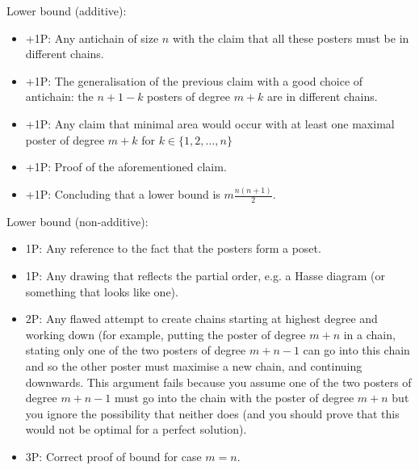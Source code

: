 {Lower bound (additive):
\begin{itemize}
\item +1P: Any antichain of size $n$ with the claim that all these posters must be in different chains.
\item +1P: The generalisation of the previous claim with a good choice of antichain: the $n+1-k$ posters of degree $m+k$ are in different chains. 
\item +1P: Any claim that minimal area would occur with at least one maximal poster of degree $m+k$ for $k \in \{1, 2, \dots , n\}$
\item +1P: Proof of the aforementioned claim.
\item +1P: Concluding that a lower bound is $m\frac{n(n+1)}{2}$.
\end{itemize}

Lower bound (non-additive):
\begin{itemize}
    \item 1P: Any reference to the fact that the posters form a poset.
    \item 1P: Any drawing that reflects the partial order, e.g. a Hasse diagram (or something that looks like one). 
    \item 2P: Any flawed attempt to create chains starting at highest degree and working down (for example, putting the poster of degree $m+n$ in a chain, stating only one of the two posters of degree $m+n-1$ can go into this chain and so the other poster must maximise a new chain, and continuing downwards. This argument fails because you assume one of the two posters of degree $m+n-1$ must go into the chain with the poster of degree $m+n$ but you ignore the possibility that neither does (and you should prove that this would not be optimal for a perfect solution). 
    \item 3P: Correct proof of bound for case $m = n$.
\end{itemize}






}